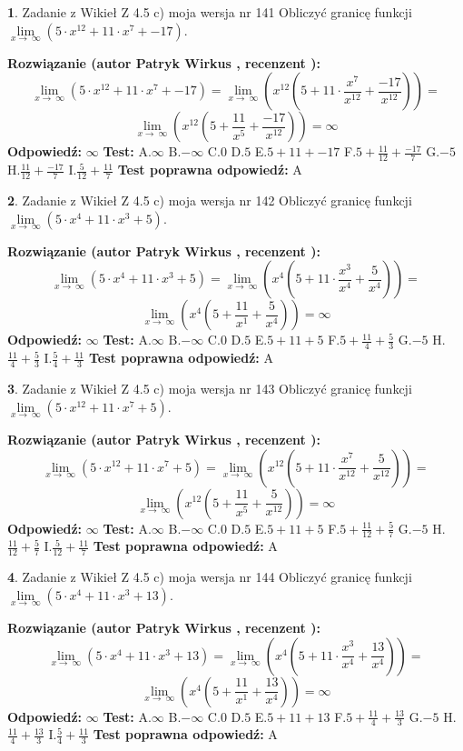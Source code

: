 \documentclass[12pt, a4paper]{article}
\theoremstyle{definition} %
\newtheorem{zad}{}
\newcommand{\zadStart}[1]{\begin{zad}#1\newline}
\newcommand{\zadStop}{\end{zad}}
\newcommand{\rozwStart}[2]{\noindent \textbf{Rozwiązanie (autor #1 , recenzent #2): }\newline}
\newcommand{\rozwStop}{\newline}
\newcommand{\odpStart}{\noindent \textbf{Odpowiedź:}\newline}
\newcommand{\odpStop}{\newline}
\newcommand{\testStart}{\noindent \textbf{Test:}\newline}
\newcommand{\testStop}{\newline}
\newcommand{\kluczStart}{\noindent \textbf{Test poprawna odpowiedź:}\newline}
\newcommand{\kluczStop}{\newline}
\begin{document}
\zadStart{Zadanie z Wikieł Z 4.5 c) moja wersja nr 141}
Obliczyć granicę funkcji  $\lim\limits_{x\to\ \infty}(5 \cdot x^{12}+11 \cdot x^{7}+-17)$.
\zadStop
\rozwStart{Patryk Wirkus}{}
$$\lim\limits_{x\to\ \infty}(5 \cdot x^{12}+11 \cdot x^{7}+-17) = \lim\limits_{x\to\ \infty}(x^{12}(5 +11 \cdot \frac{x^{7}}{x^{12}}+\frac{-17}{x^{12}})) =$$ $$\lim\limits_{x\to\ \infty}(x^{12}(5 +\frac{11}{x^{5}}+\frac{-17}{x^{12}})) =\infty$$
\rozwStop
\odpStart
$\infty$
\odpStop
\testStart
A.$\infty$ B.$-\infty$ C.$0$ D.$5$ E.$5 + 11 + -17$
F.$5+\frac{11}{12}+\frac{-17}{7}$ G.$-5$
H.$\frac{11}{12}+\frac{-17}{7}$
I.$\frac{5}{12}+\frac{11}{7}$
\testStop
\kluczStart
A
\kluczStop



\zadStart{Zadanie z Wikieł Z 4.5 c) moja wersja nr 142}
Obliczyć granicę funkcji  $\lim\limits_{x\to\ \infty}(5 \cdot x^{4}+11 \cdot x^{3}+5)$.
\zadStop
\rozwStart{Patryk Wirkus}{}
$$\lim\limits_{x\to\ \infty}(5 \cdot x^{4}+11 \cdot x^{3}+5) = \lim\limits_{x\to\ \infty}(x^{4}(5 +11 \cdot \frac{x^{3}}{x^{4}}+\frac{5}{x^{4}})) =$$ $$\lim\limits_{x\to\ \infty}(x^{4}(5 +\frac{11}{x^{1}}+\frac{5}{x^{4}})) =\infty$$
\rozwStop
\odpStart
$\infty$
\odpStop
\testStart
A.$\infty$ B.$-\infty$ C.$0$ D.$5$ E.$5 + 11 + 5$
F.$5+\frac{11}{4}+\frac{5}{3}$ G.$-5$
H.$\frac{11}{4}+\frac{5}{3}$
I.$\frac{5}{4}+\frac{11}{3}$
\testStop
\kluczStart
A
\kluczStop



\zadStart{Zadanie z Wikieł Z 4.5 c) moja wersja nr 143}
Obliczyć granicę funkcji  $\lim\limits_{x\to\ \infty}(5 \cdot x^{12}+11 \cdot x^{7}+5)$.
\zadStop
\rozwStart{Patryk Wirkus}{}
$$\lim\limits_{x\to\ \infty}(5 \cdot x^{12}+11 \cdot x^{7}+5) = \lim\limits_{x\to\ \infty}(x^{12}(5 +11 \cdot \frac{x^{7}}{x^{12}}+\frac{5}{x^{12}})) =$$ $$\lim\limits_{x\to\ \infty}(x^{12}(5 +\frac{11}{x^{5}}+\frac{5}{x^{12}})) =\infty$$
\rozwStop
\odpStart
$\infty$
\odpStop
\testStart
A.$\infty$ B.$-\infty$ C.$0$ D.$5$ E.$5 + 11 + 5$
F.$5+\frac{11}{12}+\frac{5}{7}$ G.$-5$
H.$\frac{11}{12}+\frac{5}{7}$
I.$\frac{5}{12}+\frac{11}{7}$
\testStop
\kluczStart
A
\kluczStop



\zadStart{Zadanie z Wikieł Z 4.5 c) moja wersja nr 144}
Obliczyć granicę funkcji  $\lim\limits_{x\to\ \infty}(5 \cdot x^{4}+11 \cdot x^{3}+13)$.
\zadStop
\rozwStart{Patryk Wirkus}{}
$$\lim\limits_{x\to\ \infty}(5 \cdot x^{4}+11 \cdot x^{3}+13) = \lim\limits_{x\to\ \infty}(x^{4}(5 +11 \cdot \frac{x^{3}}{x^{4}}+\frac{13}{x^{4}})) =$$ $$\lim\limits_{x\to\ \infty}(x^{4}(5 +\frac{11}{x^{1}}+\frac{13}{x^{4}})) =\infty$$
\rozwStop
\odpStart
$\infty$
\odpStop
\testStart
A.$\infty$ B.$-\infty$ C.$0$ D.$5$ E.$5 + 11 + 13$
F.$5+\frac{11}{4}+\frac{13}{3}$ G.$-5$
H.$\frac{11}{4}+\frac{13}{3}$
I.$\frac{5}{4}+\frac{11}{3}$
\testStop
\kluczStart
A
\kluczStop
\end{document}
